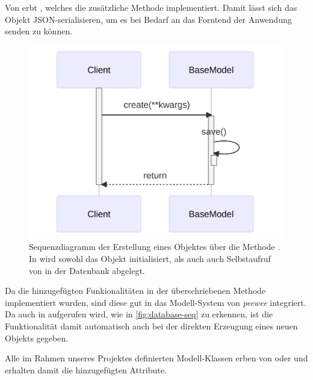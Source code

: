 Von  erbt , welches die zusätzliche Methode  implementiert. Damit lässt sich das Objekt JSON-serialisieren, um es bei Bedarf an das Forntend der Anwendung senden zu können.

\begin{figure}[!ht]
	\centering
	\includegraphics[width=0.75\linewidth]{images/diagrams/database-seq.png}
	\caption{Sequenzdiagramm der Erstellung eines Objektes über die Methode . In  wird sowohl das Objekt initialisiert, als auch auch Selbstaufruf von  in der Datenbank abgelegt.}
	\label{fig:database-seq}
\end{figure}

Da die hinzugefügten Funkionalitäten in der überschriebenen Methode  implementiert wurden, sind diese gut in das Modell-System von \emph{peewee} integriert. Da  auch in  aufgerufen wird, wie in \autoref{fig:database-seq} zu erkennen, ist die Funktionalität damit automatisch auch bei der direkten Erzeugung eines neuen Objekts gegeben.

Alle im Rahmen unseres Projektes definierten Modell-Klassen erben von  oder  und erhalten damit die hinzugefügten Attribute.